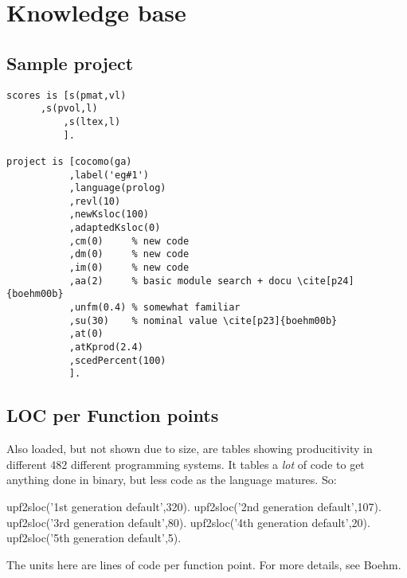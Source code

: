 \section{ Knowledge base
}
\subsection{ Sample project }\begin{Verbatim}
scores is [s(pmat,vl)
	  ,s(pvol,l)
          ,s(ltex,l)
          ].
	
project is [cocomo(ga)
           ,label('eg#1')
           ,language(prolog)
           ,revl(10)
           ,newKsloc(100)
           ,adaptedKsloc(0)
           ,cm(0)     % new code
           ,dm(0)     % new code
           ,im(0)     % new code
           ,aa(2)     % basic module search + docu \cite[p24]{boehm00b}
           ,unfm(0.4) % somewhat familiar
           ,su(30)    % nominal value \cite[p23]{boehm00b}
           ,at(0)
           ,atKprod(2.4)
           ,scedPercent(100)
           ].
\end{Verbatim}
\subsection{ LOC per Function points
}
 Also loaded, but not shown due to size,
are tables showing producitivity in different 482 different
programming systems.
It tables a {\em lot} of code to get anything done in
binary, but less code as the language matures. So:

\begin{LISTING}
upf2sloc('1st generation default',320).
upf2sloc('2nd generation default',107).
upf2sloc('3rd generation default',80).
upf2sloc('4th generation default',20).
upf2sloc('5th generation default',5).
\end{LISTING}

The units here are lines of code per function point. For more details,
	see Boehm.



